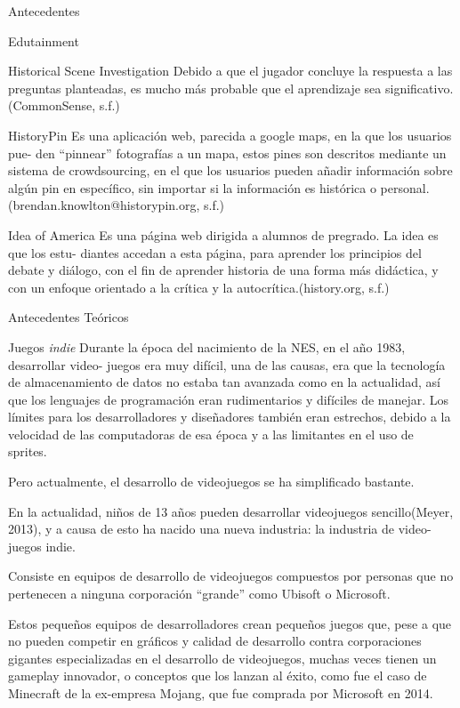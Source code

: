 \begin{section}{Antecedentes}
\begin{subsection}{Edutainment}
\begin{subsubsection}{Historical Scene Investigation}
      Debido a que el jugador concluye la respuesta a las preguntas planteadas, es mucho más probable que el aprendizaje sea significativo.(CommonSense, s.f.)
    \end{subsubsection}

    \begin{subsubsection}{HistoryPin}
      Es una aplicación web, parecida a google maps, en la que los usuarios pue- den ``pinnear'' fotografías a un mapa, estos pines son descritos mediante un sistema de crowdsourcing, en el que los usuarios pueden añadir información sobre algún pin en específico, sin importar si la información es histórica o personal.(brendan.knowlton@historypin.org, s.f.)
    \end{subsubsection}

    \begin{subsubsection}{Idea of America}
      Es una página web dirigida a alumnos de pregrado. La idea es que los estu- diantes accedan a esta página, para aprender los principios del debate y diálogo, con el fin de aprender historia de una forma más didáctica, y con un enfoque orientado a la crítica y la autocrítica.(history.org, s.f.)
    \end{subsubsection}    
  \end{subsection}

  \begin{subsection}{Antecedentes Teóricos}
    \begin{subsubsection}{Juegos \textit{indie}}
      Durante la época del nacimiento de la NES, en el año 1983, desarrollar video- juegos era muy difícil, una de las causas, era que la tecnología de almacenamiento de datos no estaba tan avanzada como en la actualidad, así que los lenguajes de programación eran rudimentarios y difíciles de manejar. Los límites para los desarrolladores y diseñadores también eran estrechos, debido a la velocidad de las computadoras de esa época y a las limitantes en el uso de sprites. 

      Pero actualmente, el desarrollo de videojuegos se ha simplificado bastante. 

      En la actualidad, niños de 13 años pueden desarrollar videojuegos sencillo(Meyer, 2013), y a causa de esto ha nacido una nueva industria: la industria de video- juegos indie. 

      Consiste en equipos de desarrollo de videojuegos compuestos por personas que no pertenecen a ninguna corporación ``grande'' como Ubisoft o Microsoft. 

      Estos pequeños equipos de desarrolladores crean pequeños juegos que, pese a que no pueden competir en gráficos y calidad de desarrollo contra corporaciones gigantes especializadas en el desarrollo de videojuegos, muchas veces tienen un gameplay innovador, o conceptos que los lanzan al éxito, como fue el caso de Minecraft de la ex-empresa Mojang, que fue comprada por Microsoft en 2014. 


\end{subsubsection}
\end{subsection}
\end{section}
